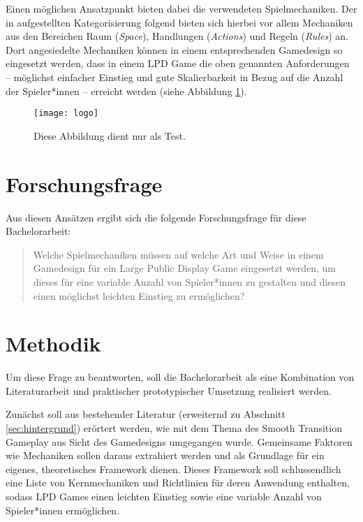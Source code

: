 Einen möglichen Ansatzpunkt bieten dabei die verwendeten Spielmechaniken. Der
in \cite{Schell2019} aufgestellten Kategorisierung folgend bieten sich hierbei 
vor allem Mechaniken aus den Bereichen Raum (\emph{Space}), Handlungen
(\emph{Actions}) und Regeln (\emph{Rules}) an. Dort angesiedelte Mechaniken
können in einem entsprechenden Gamedesign so eingesetzt werden, dass in einem
LPD Game die oben genannten Anforderungen -- möglichst einfacher Einstieg und
gute Skalierbarkeit in Bezug auf die Anzahl der Spieler*innen -- erreicht
werden (siehe Abbildung \ref{fig:logo}). %

\begin{figure}
	\centering
	\texttt{[image: logo]}
	\caption{Diese Abbildung dient nur als Test.}
	\label{fig:logo}
\end{figure}

\section{Forschungsfrage}

Aus diesen Ansätzen ergibt sich die folgende Forschungsfrage für diese
Bachelorarbeit:
%
\begin{quote}
	Welche Spielmechaniken müssen auf welche Art und Weise in einem
	Game\-design für ein Large Public Display Game eingesetzt werden, um
	dieses für eine variable Anzahl von Spieler*innen zu gestalten und diesen
	einen möglichst leichten Einstieg zu ermöglichen?
\end{quote}


\section{Methodik}

Um diese Frage zu beantworten, soll die Bachelorarbeit als eine Kombination
von Literaturarbeit und praktischer \bzw prototypischer Umsetzung realisiert
werden.

Zunächst soll aus bestehender Literatur (erweiternd zu Abschnitt
\ref{sec:hintergrund}) erörtert werden, wie mit dem Thema des Smooth
Transition Gameplay aus Sicht des Gamedesigns umgegangen wurde. Gemeinsame
Faktoren wie Mechaniken sollen daraus extrahiert werden und als Grundlage für
ein eigenes, theoretisches Framework dienen. Dieses Framework soll
schlussendlich eine Liste von Kernmechaniken und Richtlinien für deren
Anwendung enthalten, sodass LPD Games einen leichten Einstieg sowie eine
variable Anzahl von Spieler*innen ermöglichen.

